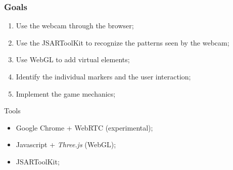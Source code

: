 \documentclass{beamer}
\begin{document}
\begin{frame}
	\frametitle{Goals}
	\begin{enumerate}
		\item{Use the webcam through the browser;}
		\item{Use the JSARToolKit to recognize the patterns seen by the webcam;}
		\item{Use WebGL to add virtual elements;}
		\item{Identify the individual markers and the user interaction;}
		\item{Implement the game mechanics;}
	\end{enumerate}
	
	\begin{block}{Tools}
		\begin{itemize}
			\item{Google Chrome + WebRTC (experimental);}
			\item{Javascript + \textit{Three.js} (WebGL);}
			\item{JSARToolKit;}
		\end{itemize}
	\end{block}
\end{frame}
\end{document}
